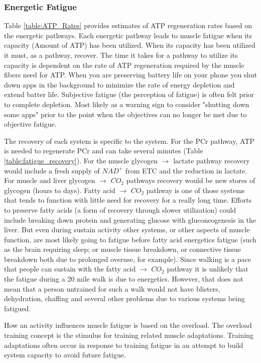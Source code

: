 \subsubsection{Energetic Fatigue}

Table \ref{table:ATP_Rates} provides estimates of ATP regeneration rates based on the energetic pathways. Each energetic pathway leads to muscle fatigue when its capacity (Amount of ATP) has been utilized. When its capacity has been utilized it must, as a pathway, recover. The time it takes for a pathway to utilize its capacity is dependent on the rate of ATP regeneration required by the muscle fibers need for ATP. When you are preserving battery life on your phone you shut down apps in the background to minimize the rate of energy depletion and extend batter life. Subjective fatigue (the perception of fatigue) is often felt prior to complete depletion. Most likely as a warning sign to consider "shutting down some apps" prior to the point when the objectives can no longer be met due to objective fatigue. 

The recovery of each system is specific to the system. For the PCr pathway, ATP is needed to regenerate PCr and can take several minutes (Table \ref{table:fatigue_recovery}). For the muscle glycogen $\rightarrow$ lactate pathway recovery would include a fresh supply of $NAD^+$ from ETC and the reduction in lactate. For muscle and liver glycogen $\rightarrow$ $CO_2$ pathways recovery would be new stores of glycogen (hours to days). Fatty acid $\rightarrow$ $CO_2$ pathway is one of those systems that tends to function with little need for recovery for a really long time. Efforts to preserve fatty acids (a form of recovery through slower utilization) could include breaking down protein and generating glucose with gluconeogenesis in the liver. But even during sustain activity other systems, or other aspects of muscle function, are most likely going to fatigue before fatty acid energetics fatigue (such as the brain requiring sleep; or muscle tissue breakdown, or connective tissue breakdown both due to prolonged overuse, for example). Since walking is a pace that people can sustain with the fatty acid $\rightarrow$ $CO_2$ pathway it is unlikely that the fatigue during a 20 mile walk is due to energetics. However, that does not mean that a person untrained for such a walk would not have blisters, dehydration, chaffing and several other problems due to various systems being fatigued.

How an activity influences muscle fatigue is based on the overload. The overload training concept is the stimulus for training related muscle adaptations. Training adaptations often occur in response to training fatigue in an attempt to build system capacity to avoid future fatigue. 

